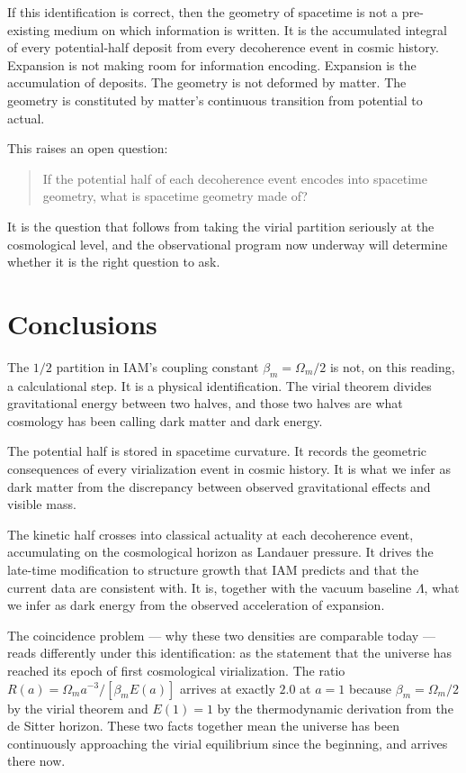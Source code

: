 If this identification is correct, then the geometry of spacetime is not a pre-existing medium on which information is written. It is the accumulated
integral of every potential-half deposit from every decoherence event in cosmic history. Expansion is not making room for information encoding. Expansion is
the accumulation of deposits. The geometry is not deformed by matter. The geometry is constituted by matter's continuous transition from potential to actual.

This raises an open question:
\begin{quote}
If the potential half of each decoherence event encodes into spacetime geometry, what is spacetime geometry made of?
\end{quote}
It is the question that follows from taking the virial partition seriously at the cosmological level, and the
observational program now underway will determine whether it is the right question to ask.

\section{Conclusions}\label{sec:vp_conclusions}
The $1/2$ partition in IAM's coupling constant $\beta_m=\Omega_m/2$ is not, on this reading, a calculational step. It is a physical identification. The
virial theorem divides gravitational energy between two halves, and those two halves are what cosmology has been calling dark matter and dark energy.
\conjecture

The potential half is stored in spacetime curvature. It records the geometric consequences of every virialization event in cosmic history. It is what we
infer as dark matter from the discrepancy between observed gravitational effects and visible mass.

The kinetic half crosses into classical actuality at each decoherence event, accumulating on the cosmological horizon as Landauer pressure. It drives the
late-time modification to structure growth that IAM predicts and that the current data are consistent with. It is, together with the vacuum baseline
$\Lambda$, what we infer as dark energy from the observed acceleration of expansion.

The coincidence problem --- why these two densities are comparable today --- reads differently under this identification: as the statement that the
universe has reached its epoch of first cosmological virialization. The ratio $R(a)=\Omega_ma^{-3}/[\beta_mE(a)]$ arrives at exactly $2.0$ at $a=1$ because
$\beta_m=\Omega_m/2$ by the virial theorem and $E(1)=1$ by the thermodynamic derivation from the de Sitter horizon. These two facts together mean the
universe has been continuously approaching the virial equilibrium since the beginning, and arrives there now. \interp

